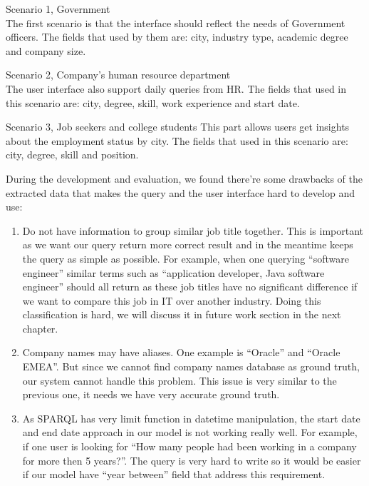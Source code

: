\begin{description}
	\item Scenario 1, Government \hfill \\
	The first scenario is that the interface should reflect the needs of Government officers. The fields that used by them are: city, industry type, academic degree and company size.
	\item Scenario 2, Company's human resource department \hfill \\
	The user interface also support daily queries from HR. The fields that used in this scenario are: city, degree, skill, work experience and start date.
	\item Scenario 3, Job seekers and college students
	This part allows users get insights about the employment status by city. The fields that used in this scenario are: city, degree, skill and position.
\end{description}

During the development and evaluation, we found there're some drawbacks of the extracted data that makes the query and the user interface hard to develop and use:
\begin{enumerate}
	\item Do not have information to group similar job title together. This is important as we want our query return more correct result and in the meantime keeps the query as simple as possible. For example, when one querying ``software engineer'' similar terms such as ``application developer, Java software engineer'' should all return as these job titles have no significant difference if we want to compare this job in IT over another industry. Doing this classification is hard, we will discuss it in future work section in the next chapter.
	\item Company names may have aliases. One example is ``Oracle'' and ``Oracle EMEA''. But since we cannot find company names database as ground truth, our system cannot handle this problem. This issue is very similar to the previous one, it needs we have very accurate ground truth.
	\item As SPARQL has very limit function in datetime manipulation, the start date and end date approach in our model is not working really well. For example, if one user is looking for ``How many people had been working in a company for more then 5 years?''. The query is very hard to write so it would be easier if our model have ``year between'' field that address this requirement.
\end{enumerate}


